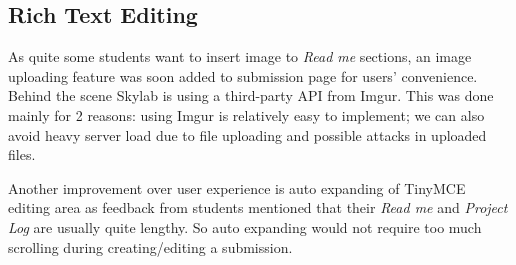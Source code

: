 \subsection{Rich Text Editing}

As quite some students want to insert image to \textit{Read me} sections, an image uploading feature was soon added to submission page for users' convenience. Behind the scene Skylab is using a third-party API from Imgur. This was done mainly for 2 reasons: using Imgur is relatively easy to implement; we can also avoid heavy server load due to file uploading and possible attacks in uploaded files.

Another improvement over user experience is auto expanding of TinyMCE editing area as feedback from students mentioned that their \textit{Read me} and \textit{Project Log} are usually quite lengthy. So auto expanding would not require too much scrolling during creating/editing a submission.
